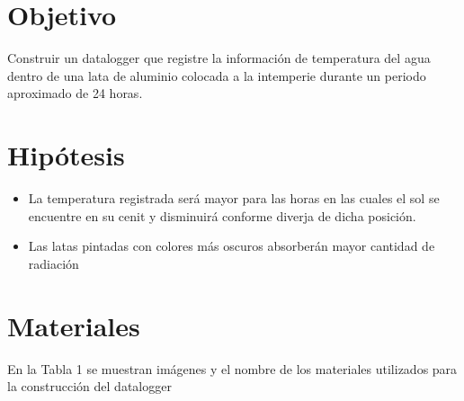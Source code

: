 \documentclass[11pt,twocolumn,letterpaper,spanish]{article}
\begin{document}
\section*{Objetivo}

Construir un datalogger que registre la información de temperatura del agua dentro de una lata de aluminio colocada a la intemperie durante un periodo aproximado de 24 horas.

\section*{Hipótesis}

\begin{itemize}
\item La temperatura registrada será mayor para las horas en las cuales el sol se encuentre en su cenit y disminuirá conforme diverja de dicha posición.
\item Las latas pintadas con colores más oscuros absorberán mayor cantidad de radiación
\end{itemize}

\section*{Materiales}

En la Tabla 1 se muestran imágenes y el nombre de los materiales utilizados para la construcción del datalogger
\end{document}
